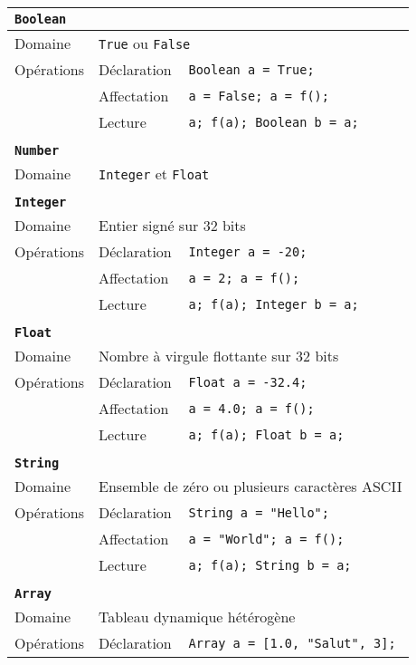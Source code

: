 \documentclass[french]{article}
\begin{document}
	\begin{longtable}{lll}
		\textbf{\texttt{Boolean}}\\ \hline \hline
		Domaine & \multicolumn{2}{l}{\texttt{True} ou \texttt{False}}\\ 
		Opérations & Déclaration & \texttt{Boolean a = True;}\\
		& Affectation & \texttt{a = False; a = f();}\\
		& Lecture & \texttt{a; f(a); Boolean b = a;}\\ 
		\\
		\textbf{\texttt{Number}}\\ \hline \hline
		Domaine & \multicolumn{2}{l}{\texttt{Integer} et \texttt{Float}}\\ 
		\\
		\textbf{\texttt{Integer}}\\ \hline \hline
		Domaine & \multicolumn{2}{l}{Entier signé sur 32 bits}\\
		Opérations & Déclaration & \texttt{Integer a = -20;}\\
		& Affectation & \texttt{a = 2; a = f();}\\
		& Lecture & \texttt{a; f(a); Integer b = a;}\\ 
		\\
		\textbf{\texttt{Float}}\\ \hline \hline
		Domaine & \multicolumn{2}{l}{Nombre à virgule flottante sur 32 bits}\\
		Opérations & Déclaration & \texttt{Float a = -32.4;}\\
		& Affectation & \texttt{a = 4.0; a = f();}\\
		& Lecture & \texttt{a; f(a); Float b = a;}\\ 
		\\
		\textbf{\texttt{String}}\\ \hline \hline
		Domaine & \multicolumn{2}{l}{Ensemble de zéro ou plusieurs caractères ASCII}\\
		Opérations & Déclaration & \texttt{String a = "Hello";}\\
		& Affectation & \texttt{a = "World"; a = f();}\\
		& Lecture & \texttt{a; f(a); String b = a;}\\ 
		\\
		\textbf{\texttt{Array}}\\ \hline \hline
		Domaine & \multicolumn{2}{l}{Tableau dynamique hétérogène}\\
		Opérations & Déclaration & \texttt{Array a = [1.0, "Salut", 3];}\\

\end{longtable}
\end{document}

